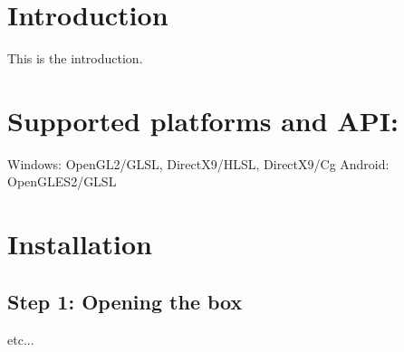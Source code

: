 \hypertarget{index_intro_sec}{}\section{Introduction}\label{index_intro_sec}
This is the introduction. \hypertarget{index_platforms_sec}{}\section{Supported platforms and A\+P\+I\+:}\label{index_platforms_sec}
Windows\+: Open\+G\+L2/\+G\+L\+S\+L, Direct\+X9/\+H\+L\+S\+L, Direct\+X9/\+Cg Android\+: Open\+G\+L\+E\+S2/\+G\+L\+S\+L\hypertarget{index_install_sec}{}\section{Installation}\label{index_install_sec}
\hypertarget{index_step1}{}\subsection{Step 1\+: Opening the box}\label{index_step1}
etc... 